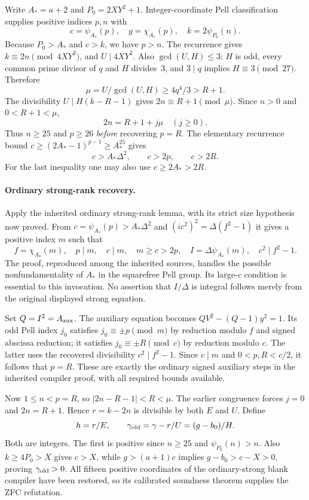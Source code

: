 Write $A_*=a+2$ and $P_0=2XY^2+1$. Integer-coordinate Pell
classification supplies positive indices $p,n$ with
\[
 c=\psi_{A_*}(p),\quad g=\chi_{A_*}(p),\quad
 k=2\psi_{P_0}(n).
\]
Because $P_0>A_*$ and $c>k$, we have $p>n$.
The recurrence gives $k\equiv2n\pmod{4XY^2}$, and
$U\mid4XY^2$. Also $\gcd(U,H)\le3$: $H$ is odd, every
common prime divisor of $q$ and $H$ divides~3, and $3\mid q$
implies $H\equiv3\pmod{27}$. Therefore
\[
 \mu=U/\gcd(U,H)\ge4q^4/3>R+1.
\]
The divisibility $U\mid H(k-R-1)$ gives
$2n\equiv R+1\pmod\mu$. Since $n>0$ and $0<R+1<\mu$,
\[
 2n=R+1+j\mu\quad(j\ge0).
\]
Thus $n\ge25$ and $p\ge26$ \emph{before} recovering $p=R$.
The elementary recurrence bound
$c\ge(2A_*-1)^{p-1}\ge A_*^{25}$ gives
\[
 c>A_*\Delta^2,\qquad c>2p,\qquad c>2R.
\]
For the last inequality one may also use $c\ge2A_*>2R$.

\paragraph{Ordinary strong-rank recovery.}
Apply the inherited ordinary strong-rank lemma, with its strict size
hypothesis now proved. From
$c=\psi_{A_*}(p)>A_*\Delta^2$ and
$(ic^2)^2=\Delta(f^2-1)$ it gives a positive index $m$ such that
\[
 f=\chi_{A_*}(m),\quad p\mid m,\quad c\mid m,\quad
 m\ge c>2p,\quad I=\Delta\psi_{A_*}(m),\quad c^2\mid f^2-1.
\]
The proof, reproduced among the inherited sources, handles the possible
nonfundamentality of $A_*$ in the squarefree Pell group. Its large-$c$
condition is essential to this invocation. No assertion that $I/\Delta$
is integral follows merely from the original displayed strong equation.

Set $Q=I^2=A_{\rm aux}$. The auxiliary equation becomes
$QV^2-(Q-1)y^2=1$. Its odd Pell index $j_0$ satisfies
$j_0\equiv\pm p\pmod m$ by reduction modulo $f$ and signed
abscissa reduction; it satisfies $j_0\equiv\pm R\pmod c$ by
reduction modulo $c$. The latter uses the recovered divisibility
$c^2\mid f^2-1$. Since $c\mid m$ and $0<p,R<c/2$, it follows
that $p=R$. These are exactly the ordinary signed auxiliary steps in
the inherited compiler proof, with all required bounds available.

Now $1\le n<p=R$, so
$|2n-R-1|<R<\mu$. The earlier congruence forces $j=0$ and
$2n=R+1$. Hence $r=k-2n$ is divisible by both $E$ and $U$.
Define
\[
 h=r/E,\qquad \gamma_{\rm old}=\gamma-r/U=(g-b_0)/H.
\]
Both are integers. The first is positive since $n\ge25$ and
$\psi_{P_0}(n)>n$. Also $k\ge4P_0>X$ gives $c>X$, while
$g>(a+1)c$ implies $g-b_0>c-X>0$, proving
$\gamma_{\rm old}>0$. All fifteen positive coordinates of the
ordinary-strong blank compiler have been restored, so its calibrated
soundness theorem supplies the ZFC refutation.

